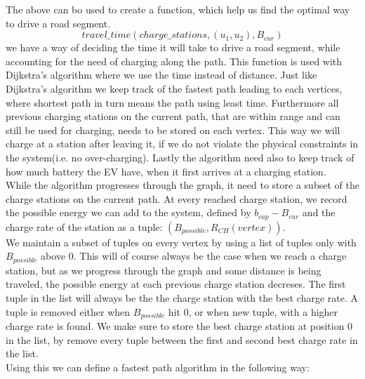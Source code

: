 The above can bo used to create a function, which help us find the optimal way to drive a road segment. 
\[travel\_time(charge\_stations, (u_1, u_2), B_{cur}) \]
we have a way of deciding the time it will take to drive a road segment, while accounting for the need of charging along the path. This function is used with Dijkstra's algorithm where we use the time instead of distance. Just like Dijkstra's algorithm we keep track of the fastest path leading to each vertices, where shortest path in turn means the path using least time. Furthermore all previous charging stations on the current path, that are within range and can still be used for charging, needs to be stored on each vertex. This way we will charge at a station after leaving it, if we do not violate the physical constraints in the system(i.e. no over-charging). Lastly the algorithm need also to keep track of how much battery the EV have, when it first arrives at a charging station.\\

While the algorithm progresses through the graph, it need to store a subset of the charge stations on the current path. At every reached charge station, we record the possible energy we can add to the system, defined by $b_{cap}-B_{cur}$ and the charge rate of the station as a tuple: $(B_{possible}, R_{CH}(vertex))$.\\
We maintain a subset of tuples on every vertex by using a list of tuples only with $B_{possible}$ above 0. This will of course always be the case when we reach a charge station, but as we progress through the graph and some distance is being traveled, the possible energy at each previous charge station decreses. The first tuple in the list will always be the the charge station with the best charge rate. A tuple is removed either when $B_{possible}$ hit 0, or when new tuple, with a higher charge rate is found. We make sure to store the best charge station at position 0 in the list, by remove every tuple between the first and second best charge rate in the list.\\

Using this we can define a fastest path algorithm in the following way: \\


